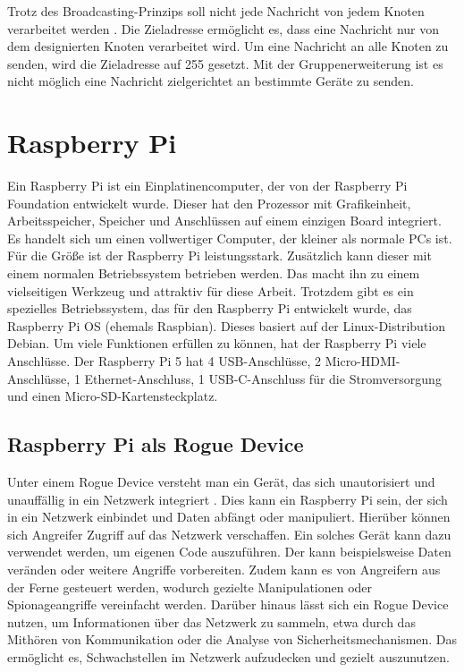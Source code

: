 Trotz des Broadcasting-Prinzips soll nicht jede Nachricht von jedem Knoten verarbeitet werden \cite{Murvay2018}.
Die Zieladresse ermöglicht es, dass eine Nachricht nur von dem designierten Knoten verarbeitet wird.
Um eine Nachricht an alle Knoten 
zu senden, wird die Zieladresse auf 255 gesetzt. Mit der Gruppenerweiterung ist es nicht möglich eine Nachricht 
zielgerichtet an bestimmte Geräte zu senden. 




\section{Raspberry Pi}
Ein Raspberry Pi ist ein Einplatinencomputer, der von der Raspberry Pi Foundation entwickelt wurde. 
Dieser hat den Prozessor mit Grafikeinheit, Arbeitsspeicher, Speicher und Anschlüssen auf einem einzigen Board integriert.
Es handelt sich um einen vollwertiger Computer, der kleiner als normale PCs ist. Für die Größe ist der Raspberry Pi
leistungsstark. Zusätzlich kann dieser mit einem normalen Betriebssystem
betrieben werden. Das macht ihn zu einem vielseitigen Werkzeug und attraktiv für diese Arbeit.
Trotzdem gibt es ein spezielles Betriebssystem, das für den Raspberry Pi entwickelt wurde, das Raspberry Pi OS (ehemals Raspbian).
Dieses basiert auf der Linux-Distribution Debian. Um viele Funktionen erfüllen zu können, hat der Raspberry Pi viele Anschlüsse.
Der Raspberry Pi 5 hat 4 USB-Anschlüsse, 2 Micro-HDMI-Anschlüsse, 1 Ethernet-Anschluss, 1 USB-C-Anschluss 
für die Stromversorgung und einen Micro-SD-Kartensteckplatz.

\subsection{Raspberry Pi als Rogue Device}
Unter einem Rogue Device versteht man ein Gerät, das sich unautorisiert und unauffällig in ein Netzwerk integriert \cite{Scarfone2008}.
Dies kann ein Raspberry Pi sein, der sich in ein Netzwerk einbindet und Daten abfängt oder manipuliert. Hierüber können 
sich Angreifer Zugriff auf das Netzwerk verschaffen. 
Ein solches Gerät kann dazu verwendet werden, um eigenen Code auszuführen. Der kann beispielsweise Daten veränden oder 
weitere Angriffe vorbereiten. Zudem kann es von Angreifern aus der Ferne gesteuert werden, wodurch gezielte 
Manipulationen oder Spionageangriffe vereinfacht werden. Darüber hinaus lässt sich ein Rogue Device nutzen, um Informationen 
über das Netzwerk zu sammeln, etwa durch das Mithören von Kommunikation oder die Analyse von Sicherheitsmechanismen.
Das ermöglicht es, Schwachstellen im Netzwerk aufzudecken und gezielt auszunutzen.

